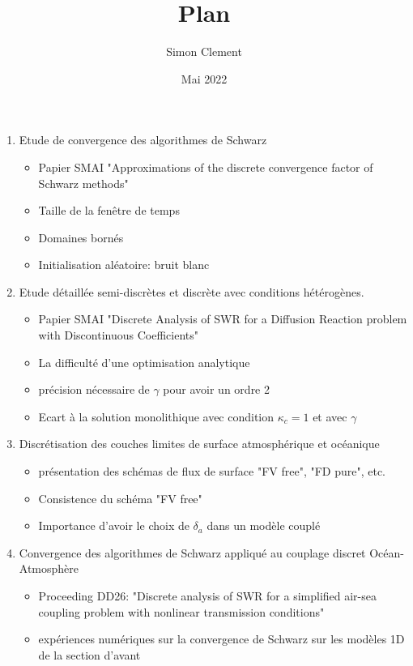 \documentclass{article}
\title{Plan}
\author{Simon Clement}
\date{Mai 2022}
\begin{document}
\begin{enumerate}
\item Etude de convergence des algorithmes de Schwarz
	\begin{itemize}
		\item Papier SMAI "Approximations of the discrete
			convergence factor of Schwarz methods"
		\item Taille de la fenêtre de temps
		\item Domaines bornés
		\item Initialisation aléatoire: bruit blanc 	
	\end{itemize}
\item Etude détaillée semi-discrètes et discrète avec
	conditions hétérogènes.
	\begin{itemize}
		\item Papier SMAI "Discrete Analysis of SWR for a Diffusion
			Reaction problem with Discontinuous Coefficients"
		\item La difficulté d'une optimisation analytique
		\item précision nécessaire de $\gamma$ pour avoir un ordre 2
		\item Ecart à la solution monolithique avec condition $\kappa_c=1$
			et avec $\gamma$
	\end{itemize}
\item Discrétisation des couches limites de surface atmosphérique
	et océanique
	\begin{itemize}
		\item présentation des schémas de flux de surface
			"FV free", "FD pure", etc.
		\item Consistence du schéma "FV free"
		\item Importance d'avoir le choix de $\delta_a$ dans
			un modèle couplé
	\end{itemize}
\item Convergence des algorithmes de Schwarz appliqué au couplage
	discret Océan-Atmosphère
	\begin{itemize}
	\item Proceeding DD26: "Discrete analysis of SWR for a
		simplified air-sea coupling problem
		with nonlinear transmission conditions"
	\item expériences numériques sur la convergence de Schwarz
		sur les modèles 1D de la section d'avant
	\end{itemize}
\end{enumerate}
\end{document}
